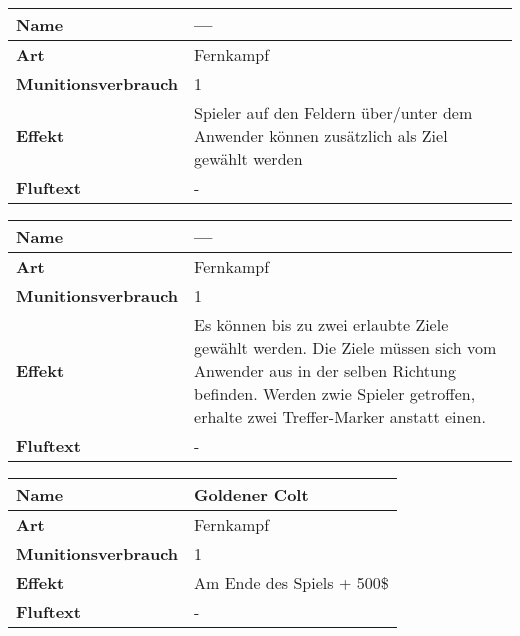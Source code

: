 \begin{table}[H]
  \begin{center}
    \label{tab:table1}
    \begin{tabular}{|l|p{8cm}|}
      \hline
      \textbf{Name} & --- \\
      \hline
      \textbf{Art} & Fernkampf \\
      \hline
      \textbf{Munitionsverbrauch} & 1 \\
      \hline
      \textbf{Effekt} & Spieler auf den Feldern über/unter dem Anwender können zusätzlich als Ziel gewählt
                        werden \\
      \hline
      \textbf{Fluftext} & - \\
      \hline
    \end{tabular}
  \end{center}
\end{table}

\begin{table}[H]
  \begin{center}
    \label{tab:table1}
    \begin{tabular}{|l|p{8cm}|}
      \hline
      \textbf{Name} & --- \\
      \hline
      \textbf{Art} & Fernkampf \\
      \hline
      \textbf{Munitionsverbrauch} & 1 \\
      \hline
      \textbf{Effekt} & Es können bis zu zwei erlaubte Ziele gewählt werden. Die Ziele müssen sich vom
                        Anwender aus in der selben Richtung befinden. Werden zwie Spieler getroffen, erhalte zwei
                        Treffer-Marker anstatt einen.\\
      \hline
      \textbf{Fluftext} & - \\
      \hline
    \end{tabular}
  \end{center}
\end{table}

\begin{table}[H]
  \begin{center}
    \label{tab:table1}
    \begin{tabular}{|l|p{8cm}|}
      \hline
      \textbf{Name} & Goldener Colt \\
      \hline
      \textbf{Art} & Fernkampf \\
      \hline
      \textbf{Munitionsverbrauch} & 1 \\
      \hline
      \textbf{Effekt} & Am Ende des Spiels + 500\$ \\
      \hline
      \textbf{Fluftext} & - \\
      \hline
    \end{tabular}
  \end{center}
\end{table}
